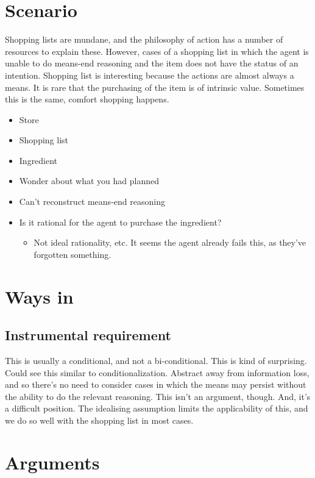 \documentclass[10pt]{article}
\begin{document}
\section{Scenario}
\label{sec:scenario}

Shopping lists are mundane, and the philosophy of action has a number of resources to explain these.
However, cases of a shopping list in which the agent is unable to do means-end reasoning and the item does not have the status of an intention.
Shopping list is interesting because the actions are almost always a means.
It is rare that the purchasing of the item is of intrinsic value.
Sometimes this is the same, comfort shopping happens.

\begin{itemize}
\item Store
\item Shopping list
\item Ingredient
\item Wonder about what you had planned
\item Can't reconstruct means-end reasoning
\item Is it rational for the agent to purchase the ingredient?
  \begin{itemize}
  \item Not ideal rationality, etc.
    It seems the agent already fails this, as they've forgotten something.
  \end{itemize}
\end{itemize}

\section{Ways in}
\label{sec:ways}

\subsection{Instrumental requirement}
\label{sec:instr-requ}

This is usually a conditional, and not a bi-conditional.
This is kind of surprising.
Could see this similar to conditionalization.
Abstract away from information loss, and so there's no need to consider cases in which the means may persist without the ability to do the relevant reasoning.
This isn't an argument, though.
And, it's a difficult position.
The idealising assumption limits the applicability of this, and we do so well with the shopping list in most cases.

\section{Arguments}
\label{sec:arguments}
\end{document}
